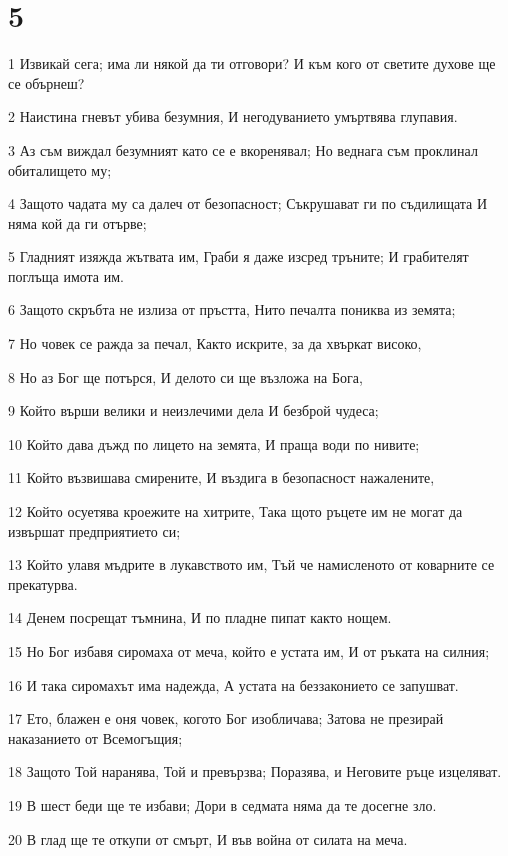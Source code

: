 \chapter{5}

\par 1 Извикай сега; има ли някой да ти отговори? И към кого от светите духове ще се обърнеш?
\par 2 Наистина гневът убива безумния, И негодуванието умъртвява глупавия.
\par 3 Аз съм виждал безумният като се е вкоренявал; Но веднага съм проклинал обиталището му;
\par 4 Защото чадата му са далеч от безопасност; Съкрушават ги по съдилищата И няма кой да ги отърве;
\par 5 Гладният изяжда жътвата им, Граби я даже изсред тръните; И грабителят поглъща имота им.
\par 6 Защото скръбта не излиза от пръстта, Нито печалта пониква из земята;
\par 7 Но човек се ражда за печал, Както искрите, за да хвъркат високо,
\par 8 Но аз Бог ще потърся, И делото си ще възложа на Бога,
\par 9 Който върши велики и неизлечими дела И безброй чудеса;
\par 10 Който дава дъжд по лицето на земята, И праща води по нивите;
\par 11 Който възвишава смирените, И въздига в безопасност нажалените,
\par 12 Който осуетява кроежите на хитрите, Така щото ръцете им не могат да извършат предприятието си;
\par 13 Който улавя мъдрите в лукавството им, Тъй че намисленото от коварните се прекатурва.
\par 14 Денем посрещат тъмнина, И по пладне пипат както нощем.
\par 15 Но Бог избавя сиромаха от меча, който е устата им, И от ръката на силния;
\par 16 И така сиромахът има надежда, А устата на беззаконието се запушват.
\par 17 Ето, блажен е оня човек, когото Бог изобличава; Затова не презирай наказанието от Всемогъщия;
\par 18 Защото Той наранява, Той и превързва; Поразява, и Неговите ръце изцеляват.
\par 19 В шест беди ще те избави; Дори в седмата няма да те досегне зло.
\par 20 В глад ще те откупи от смърт, И във война от силата на меча.
